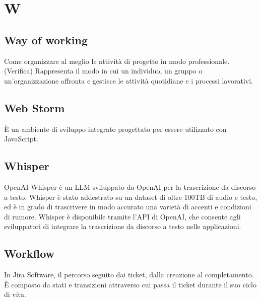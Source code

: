 \chapter{W}

\section{Way of working}\label{sec:WoW}
Come organizzare al meglio le attività di progetto in modo professionale.
(Verifica) Rappresenta il modo in cui un individuo, un gruppo o un'organizzazione affronta e gestisce le attività quotidiane e i processi lavorativi. 

\section{Web Storm}\label{sec:wstrm}
È un ambiente di sviluppo integrato progettato per essere utilizzato con JavaScript. 

\section{Whisper}
OpenAI Whisper è un LLM sviluppato da OpenAI per la trascrizione da discorso a testo. Whisper è stato addestrato su un dataset di oltre 100TB di audio e testo, ed è in grado di trascrivere in modo accurato una varietà di accenti e condizioni di rumore. Whisper è disponibile tramite l'API di OpenAI, che consente agli sviluppatori di integrare la trascrizione da discorso a testo nelle applicazioni.

\section{Workflow}
In Jira Software, il percorso seguito dai ticket, dalla creazione al completamento. È composto da stati e transizioni attraverso cui passa il ticket durante il suo ciclo di vita.

